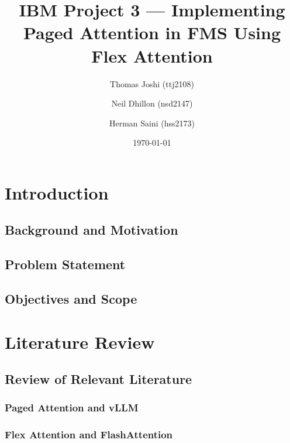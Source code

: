 \documentclass[11pt]{article}
\title{IBM Project 3 --- Implementing Paged Attention in FMS Using Flex Attention}
\author{
  Thomas Joshi (ttj2108) \and
  Neil Dhillon (nsd2147) \and
  Herman Saini (hss2173)
}
\date{\today}
\begin{document}
\maketitle
\begin{abstract}
\end{abstract}

\tableofcontents
\newpage

\section{Introduction}
  \subsection{Background and Motivation}
  
  \subsection{Problem Statement}
  
  \subsection{Objectives and Scope}

\section{Literature Review}
  \subsection{Review of Relevant Literature}
  \subsubsection{Paged Attention and vLLM}

  \subsubsection{Flex Attention and FlashAttention}
\end{document}
